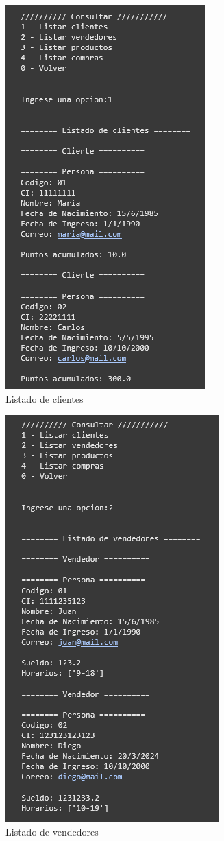 \documentclass[11pt]{article}
\begin{document}
\begin{multicols}{2}
\begin{figure}[H]
    \centering
    \includegraphics[width=0.5\linewidth]{./anexos/evidencias/listadoClientes.png}
    \caption{Listado de clientes}
    \label{fig:listadoClientes}
\end{figure}

\begin{figure}[H]
    \centering
    \includegraphics[width=0.5\linewidth]{./anexos/evidencias/listadoVendedores.png}
    \caption{Listado de vendedores}
    \label{fig:listadoVendedores}
\end{figure}


\end{multicols}
\end{document}
